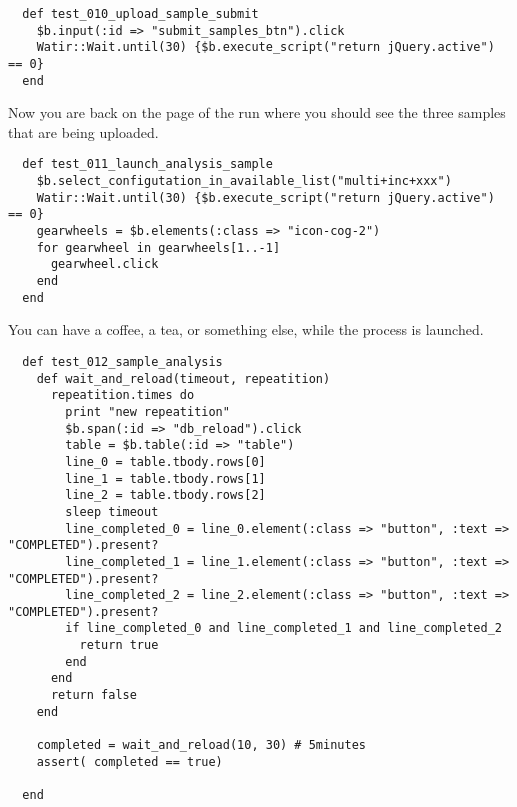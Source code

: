\begin{verbatim}
  def test_010_upload_sample_submit
    $b.input(:id => "submit_samples_btn").click
    Watir::Wait.until(30) {$b.execute_script("return jQuery.active") == 0}
  end

\end{verbatim}

Now you are back on the page of the run where you should see the three samples
that are being uploaded.

\begin{verbatim}
  def test_011_launch_analysis_sample
    $b.select_configutation_in_available_list("multi+inc+xxx")
    Watir::Wait.until(30) {$b.execute_script("return jQuery.active") == 0}
    gearwheels = $b.elements(:class => "icon-cog-2")
    for gearwheel in gearwheels[1..-1]
      gearwheel.click
    end
  end

\end{verbatim}

You can have a coffee, a tea, or something else, while the process is
launched.

\begin{verbatim}
  def test_012_sample_analysis
    def wait_and_reload(timeout, repeatition)
      repeatition.times do
        print "new repeatition"
        $b.span(:id => "db_reload").click
        table = $b.table(:id => "table")
        line_0 = table.tbody.rows[0]
        line_1 = table.tbody.rows[1]
        line_2 = table.tbody.rows[2]
        sleep timeout
        line_completed_0 = line_0.element(:class => "button", :text => "COMPLETED").present?
        line_completed_1 = line_1.element(:class => "button", :text => "COMPLETED").present?
        line_completed_2 = line_2.element(:class => "button", :text => "COMPLETED").present?
        if line_completed_0 and line_completed_1 and line_completed_2
          return true
        end
      end
      return false
    end

    completed = wait_and_reload(10, 30) # 5minutes
    assert( completed == true)

  end

\end{verbatim}

